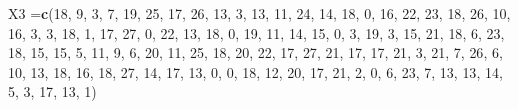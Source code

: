 \documentclass[
]{book}
\newenvironment{Shaded}{\begin{snugshade}}{\end{snugshade}}
\newcommand{\DecValTok}[1]{\textcolor[rgb]{0.00,0.00,0.81}{#1}}
\newcommand{\FunctionTok}[1]{\textcolor[rgb]{0.13,0.29,0.53}{\textbf{#1}}}
\newcommand{\NormalTok}[1]{#1}
\newcommand{\OtherTok}[1]{\textcolor[rgb]{0.56,0.35,0.01}{#1}}
\begin{document}
\begin{Shaded}
\begin{Highlighting}[]
\NormalTok{X3 }\OtherTok{=}\FunctionTok{c}\NormalTok{(}\DecValTok{18}\NormalTok{, }\DecValTok{9}\NormalTok{, }\DecValTok{3}\NormalTok{, }\DecValTok{7}\NormalTok{, }\DecValTok{19}\NormalTok{, }\DecValTok{25}\NormalTok{, }\DecValTok{17}\NormalTok{, }\DecValTok{26}\NormalTok{, }\DecValTok{13}\NormalTok{, }\DecValTok{3}\NormalTok{, }\DecValTok{13}\NormalTok{, }\DecValTok{11}\NormalTok{, }\DecValTok{24}\NormalTok{, }\DecValTok{14}\NormalTok{, }\DecValTok{18}\NormalTok{, }\DecValTok{0}\NormalTok{, }\DecValTok{16}\NormalTok{, }\DecValTok{22}\NormalTok{, }\DecValTok{23}\NormalTok{, }
      \DecValTok{18}\NormalTok{, }\DecValTok{26}\NormalTok{, }\DecValTok{10}\NormalTok{, }\DecValTok{16}\NormalTok{, }\DecValTok{3}\NormalTok{, }\DecValTok{3}\NormalTok{, }\DecValTok{18}\NormalTok{, }\DecValTok{1}\NormalTok{, }\DecValTok{17}\NormalTok{, }\DecValTok{27}\NormalTok{, }\DecValTok{0}\NormalTok{, }\DecValTok{22}\NormalTok{, }\DecValTok{13}\NormalTok{, }\DecValTok{18}\NormalTok{, }\DecValTok{0}\NormalTok{, }\DecValTok{19}\NormalTok{, }\DecValTok{11}\NormalTok{, }\DecValTok{14}\NormalTok{, }\DecValTok{15}\NormalTok{, }
      \DecValTok{0}\NormalTok{, }\DecValTok{3}\NormalTok{, }\DecValTok{19}\NormalTok{, }\DecValTok{3}\NormalTok{, }\DecValTok{15}\NormalTok{, }\DecValTok{21}\NormalTok{, }\DecValTok{18}\NormalTok{, }\DecValTok{6}\NormalTok{, }\DecValTok{23}\NormalTok{, }\DecValTok{18}\NormalTok{, }\DecValTok{15}\NormalTok{, }\DecValTok{15}\NormalTok{, }\DecValTok{5}\NormalTok{, }\DecValTok{11}\NormalTok{, }\DecValTok{9}\NormalTok{, }\DecValTok{6}\NormalTok{, }\DecValTok{20}\NormalTok{, }\DecValTok{11}\NormalTok{, }\DecValTok{25}\NormalTok{, }\DecValTok{18}\NormalTok{, }
      \DecValTok{20}\NormalTok{, }\DecValTok{22}\NormalTok{, }\DecValTok{17}\NormalTok{, }\DecValTok{27}\NormalTok{, }\DecValTok{21}\NormalTok{, }\DecValTok{17}\NormalTok{, }\DecValTok{17}\NormalTok{, }\DecValTok{21}\NormalTok{, }\DecValTok{3}\NormalTok{, }\DecValTok{21}\NormalTok{, }\DecValTok{7}\NormalTok{, }\DecValTok{26}\NormalTok{, }\DecValTok{6}\NormalTok{, }\DecValTok{10}\NormalTok{, }\DecValTok{13}\NormalTok{, }\DecValTok{18}\NormalTok{, }\DecValTok{16}\NormalTok{, }\DecValTok{18}\NormalTok{, }\DecValTok{27}\NormalTok{, }
      \DecValTok{14}\NormalTok{, }\DecValTok{17}\NormalTok{, }\DecValTok{13}\NormalTok{, }\DecValTok{0}\NormalTok{, }\DecValTok{0}\NormalTok{, }\DecValTok{18}\NormalTok{, }\DecValTok{12}\NormalTok{, }\DecValTok{20}\NormalTok{, }\DecValTok{17}\NormalTok{, }\DecValTok{21}\NormalTok{, }\DecValTok{2}\NormalTok{, }\DecValTok{0}\NormalTok{, }\DecValTok{6}\NormalTok{, }\DecValTok{23}\NormalTok{, }\DecValTok{7}\NormalTok{, }\DecValTok{13}\NormalTok{, }\DecValTok{13}\NormalTok{, }\DecValTok{14}\NormalTok{, }\DecValTok{5}\NormalTok{, }\DecValTok{3}\NormalTok{, }
      \DecValTok{17}\NormalTok{, }\DecValTok{13}\NormalTok{, }\DecValTok{1}\NormalTok{)}
\end{Highlighting}
\end{Shaded}
\end{document}
